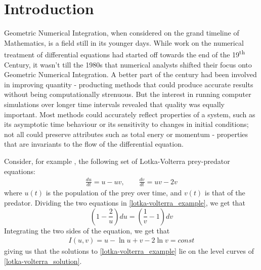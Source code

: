 \documentclass[a4paper, 12pt]{article}
\begin{document}
\section{Introduction}

Geometric Numerical Integration, when considered on the grand timeline of Mathematics, is a field still in its younger days. While work on the numerical treatment of differential equations had started off towards the end of the 19\textsuperscript{th} Century, it wasn't till the 1980s that numerical analysts shifted their focus onto Geometric Numerical Integration.  A  better part of the century had been involved in improving quantity -  producting methods that could produce accurate results without being computationally strenuous. But the interest in running computer simulations over longer time intervals revealed that quality was equally important. Most methods could accurately reflect properties of a system, such as its asymptotic time behaviour or its sensitivity to changes in initial conditions; not all could preserve attributes such as total enery or momentum - properties that are invariants to the flow of the differential equation.

Consider, for example \cite{Hairer2006}, the following set of Lotka-Volterra prey-predator equations:
\begin{eqnarray}
	\frac{du}{dt} = u - uv, \qquad \frac{dv}{dt} = uv - 2v \label{lotka-volterra_example}
\end{eqnarray} where $u(t)$ is the population of the prey over time, and $v(t)$ is that of the predator. Dividing the two equations in \ref{lotka-volterra_example}, we get that
$$
\left(1 -  \frac{2}{u}\right) du = \left(\frac{1}{v} - 1\right) dv
$$
Integrating the two sides of the equation, we get that
\begin{eqnarray}
I(u, v) = u - \ln{u} +  v - 2\ln{v} = const \label{lotka-volterra_solution}
\end{eqnarray}
giving us that the solutions to \ref{lotka-volterra_example} lie on the level curves of \ref{lotka-volterra_solution}.
\end{document}
